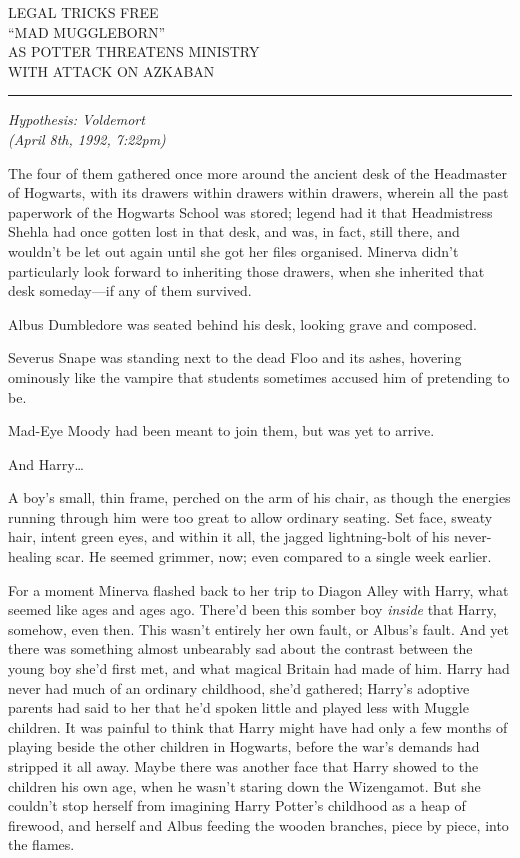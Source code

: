 LEGAL TRICKS FREE\\``MAD MUGGLEBORN''\\AS POTTER THREATENS
MINISTRY\\WITH ATTACK ON AZKABAN

\begin{center}\rule{3in}{0.4pt}\end{center}

\emph{Hypothesis: Voldemort}\\\emph{(April 8th, 1992, 7:22pm)}

The four of them gathered once more around the ancient desk of the
Headmaster of Hogwarts, with its drawers within drawers within drawers,
wherein all the past paperwork of the Hogwarts School was stored; legend
had it that Headmistress Shehla had once gotten lost in that desk, and
was, in fact, still there, and wouldn't be let out again until she got
her files organised. Minerva didn't particularly look forward to
inheriting those drawers, when she inherited that desk someday---if any
of them survived.

Albus Dumbledore was seated behind his desk, looking grave and composed.

Severus Snape was standing next to the dead Floo and its ashes, hovering
ominously like the vampire that students sometimes accused him of
pretending to be.

Mad-Eye Moody had been meant to join them, but was yet to arrive.

And Harry\ldots{}

A boy's small, thin frame, perched on the arm of his chair, as though
the energies running through him were too great to allow ordinary
seating. Set face, sweaty hair, intent green eyes, and within it all,
the jagged lightning-bolt of his never-healing scar. He seemed grimmer,
now; even compared to a single week earlier.

For a moment Minerva flashed back to her trip to Diagon Alley with
Harry, what seemed like ages and ages ago. There'd been this somber boy
\emph{inside} that Harry, somehow, even then. This wasn't entirely her
own fault, or Albus's fault. And yet there was something almost
unbearably sad about the contrast between the young boy she'd first met,
and what magical Britain had made of him. Harry had never had much of an
ordinary childhood, she'd gathered; Harry's adoptive parents had said to
her that he'd spoken little and played less with Muggle children. It was
painful to think that Harry might have had only a few months of playing
beside the other children in Hogwarts, before the war's demands had
stripped it all away. Maybe there was another face that Harry showed to
the children his own age, when he wasn't staring down the Wizengamot.
But she couldn't stop herself from imagining Harry Potter's childhood as
a heap of firewood, and herself and Albus feeding the wooden branches,
piece by piece, into the flames.

